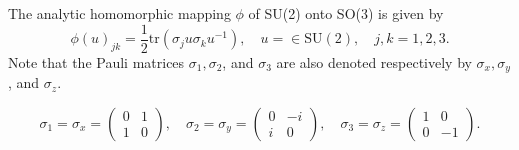 \documentclass[UTF8,10pt,a4paper]{article}
\theoremstyle{Problem}
\theoremstyle{Solution}
\begin{document}
\thispagestyle{FirstPageStyle}
The analytic homomorphic mapping $\phi$ of SU(2) onto SO(3) is given by
\[
    \phi(u)_{jk}=\frac{1}{2}\text{tr}(\sigma_ju\sigma_ku^{-1}),\quad u=\in\text{SU}(2),\quad j,k=1,2,3.
\]
Note that the Pauli matrices $\sigma_1,\sigma_2$, and $\sigma_3$ are also denoted respectively by $\sigma_x,\sigma_y$, and $\sigma_z$.

\[
    \sigma_1=\sigma_x=\left(\begin{matrix}
        0&1\\
        1&0
    \end{matrix}\right),\quad\sigma_2=\sigma_y=\left(\begin{matrix}
        0&-i\\
        i&0
    \end{matrix}\right),\quad\sigma_3=\sigma_z=\left(\begin{matrix}
        1&0\\
        0&-1
    \end{matrix}\right).
\]
\end{document}
